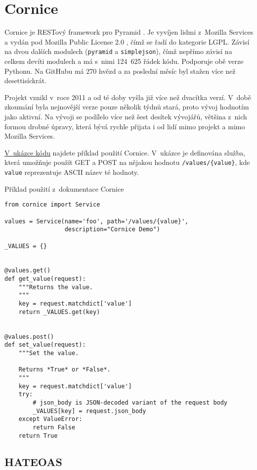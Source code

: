 \section{Cornice}\label{cornice}

Cornice je RESTový framework pro Pyramid \autocite{cornice}. Je vyvíjen lidmi z~Mozilla Services a vydán pod Mozilla Public License 2.0 \autocite{mpl2}, čímž se řadí do kategorie LGPL. Závisí na dvou dalších modulech (\verb!pyramid! a \verb!simplejson!), čímž nepřímo závisí na celkem devíti modulech a má s~nimi 124~625 řádek kódu. Podporuje obě verze Pythonu. Na GitHubu má 270 hvězd a za poslední měsíc byl stažen více než desettisíckrát.

Projekt vznikl v~roce 2011 a od té doby vyšla již více než dvacítka verzí. V~době zkoumání byla nejnovější verze pouze několik týdnů stará, proto vývoj hodnotím jako aktivní. Na vývoji se podílelo více než šest desítek vývojářů, většina z~nich formou drobné úpravy, která bývá rychle přijata i od lidí mimo projekt a mimo Mozilla Services.

\protect\hyperlink{code:cornice}{V~ukázce kódu} najdete příklad použití Cornice. V~ukázce je definována služba, která umožňuje použít GET a POST na nějakou hodnotu \verb!/values/{value}!, kde \verb!value! reprezentuje ASCII název té hodnoty.

\begin{listing}[htbp]
\caption{{\label{code:cornice}Příklad použití z~dokumentace Cornice \autocite{cornicedoc}}}
\begin{verbatim}
from cornice import Service

values = Service(name='foo', path='/values/{value}',
                 description="Cornice Demo")

_VALUES = {}


@values.get()
def get_value(request):
    """Returns the value.
    """
    key = request.matchdict['value']
    return _VALUES.get(key)


@values.post()
def set_value(request):
    """Set the value.

    Returns *True* or *False*.
    """
    key = request.matchdict['value']
    try:
        # json_body is JSON-decoded variant of the request body
        _VALUES[key] = request.json_body
    except ValueError:
        return False
    return True
\end{verbatim}
\end{listing}

\subsection{HATEOAS}\label{hateoas}

